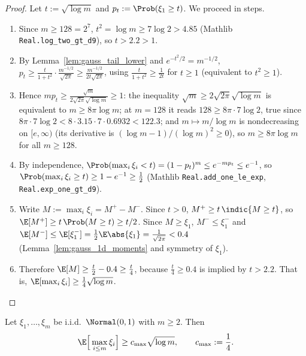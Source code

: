 \begin{proof}
\leanok
{}
Let $t := \sqrt{\log m}$ and $p_t := \Prob(\xi_1\ge t)$. We proceed in steps.
\begin{enumerate}
  \item[(i)] Since $m\ge128 = 2^7$, $t^2 = \log m \ge 7\log 2 > 4.85$ (Mathlib
        \texttt{Real.log\_two\_gt\_d9}), so $t > 2.2 > 1$.
  \item[(ii)] By Lemma~\ref{lem:gauss_tail_lower} and $e^{-t^2/2} = m^{-1/2}$,
        $p_t \ge \frac{t}{1+t^2}\cdot\frac{m^{-1/2}}{\sqrt{2\pi}} \ge \frac{m^{-1/2}}{2t\sqrt{2\pi}}$,
        using $\frac{t}{1+t^2}\ge\frac{1}{2t}$ for $t\ge1$ (equivalent to $t^2\ge1$).
  \item[(iii)] Hence $mp_t \ge \frac{\sqrt m}{2\sqrt{2\pi}\sqrt{\log m}} \ge 1$: the inequality
        $\sqrt m \ge 2\sqrt{2\pi}\sqrt{\log m}$ is equivalent to $m \ge 8\pi\log m$; at
        $m = 128$ it reads $128\ge 8\pi\cdot7\log2$, true since $8\pi\cdot7\log 2 < 8\cdot3.15\cdot7\cdot0.6932 < 122.3$;
        and $m\mapsto m/\log m$ is nondecreasing on $[e,\infty)$ (its derivative is
        $(\log m - 1)/(\log m)^2\ge0$), so $m\ge 8\pi\log m$ for all $m\ge128$.
  \item[(iv)] By independence, $\Prob(\max_i\xi_i < t) = (1-p_t)^m \le e^{-mp_t} \le e^{-1}$,
        so $\Prob(\max_i\xi_i\ge t) \ge 1 - e^{-1} \ge \frac12$ (Mathlib
        \texttt{Real.add\_one\_le\_exp}, \texttt{Real.exp\_one\_gt\_d9}).
  \item[(v)] Write $M := \max_i\xi_i = M^+ - M^-$. Since $t > 0$, $M^+ \ge t\,\indic\{M\ge t\}$, so
        $\E[M^+] \ge t\,\Prob(M\ge t) \ge t/2$. Since $M\ge\xi_1$, $M^- \le \xi_1^-$ and
        $\E[M^-]\le\E[\xi_1^-] = \frac12\E\abs{\xi_1} = \frac{1}{\sqrt{2\pi}} < 0.4$
        (Lemma~\ref{lem:gauss_1d_moments} and symmetry of $\xi_1$).
  \item[(vi)] Therefore $\E[M] \ge \frac t2 - 0.4 \ge \frac t4$, because $\frac t4 \ge 0.4$ is
        implied by $t > 2.2$. That is, $\E[\max_i\xi_i]\ge\frac14\sqrt{\log m}$.
\end{enumerate}
\end{proof}

\begin{lemma}\label{lem:gauss_max_lower}
\leanok
{}
Let $\xi_1,\dots,\xi_m$ be i.i.d.\ $\Normal(0,1)$ with $m\ge2$. Then
\[
  \E\Big[\max_{i\le m}\xi_i\Big] \ge c_{\max}\sqrt{\log m},\qquad c_{\max} := \frac14 .
\]
\end{lemma}


